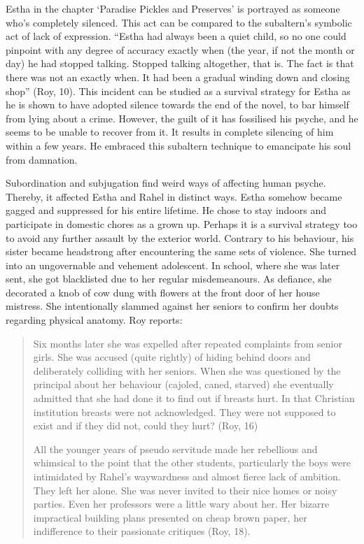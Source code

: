 Estha in the chapter ‘Paradise Pickles and Preserves’ is portrayed as someone who’s completely silenced. This act can be compared to the subaltern’s symbolic act of lack of expression. “Estha had always been a quiet child, so no one could pinpoint with any degree of accuracy exactly when (the year, if not the month or day) he had stopped talking. Stopped talking altogether, that is. The fact is that there was not an exactly when. It had been a gradual winding down and closing shop” (Roy, 10). This incident can be studied as a survival strategy for Estha as he is shown to have adopted silence towards the end of the novel, to bar himself from lying about a crime. However, the guilt of it has fossilised his psyche, and he seems to be unable to recover from it. It results in complete silencing of him within a few years. He embraced this subaltern technique to emancipate his soul from damnation.  

Subordination and subjugation find weird ways of affecting human psyche. Thereby, it affected Estha and Rahel in distinct ways. Estha somehow became gagged and suppressed for his entire lifetime. He chose to stay indoors and participate in domestic chores as a grown up. Perhaps it is a survival strategy too to avoid any further assault by the exterior world. Contrary to his behaviour, his sister became headstrong after encountering the same sets of violence. She turned into an ungovernable and vehement adolescent. In school, where she was later sent, she got blacklisted due to her regular misdemeanours. As defiance, she decorated a knob of cow dung with flowers at the front door of her house mistress. She intentionally slammed against her seniors to confirm her doubts regarding physical anatomy. Roy reports: 

\begin{quote}
  Six months later she was expelled after repeated complaints from senior girls. She was accused (quite rightly) of hiding behind doors and deliberately colliding with her seniors. When she was questioned by the principal about her behaviour (cajoled, caned, starved) she eventually admitted that she had done it to find out if breasts hurt. In that Christian institution breasts were not acknowledged. They were not supposed to exist and if they did not, could they hurt? (Roy, 16)

  All the younger years of pseudo servitude made her rebellious and whimsical to the point that the other students, particularly the boys were intimidated by Rahel’s waywardness and almost fierce lack of ambition. They left her alone. She was never invited to their nice homes or noisy parties. Even her professors were a little wary about her. Her bizarre impractical building plans presented on cheap brown paper, her indifference to their passionate critiques (Roy, 18). 
\end{quote}

